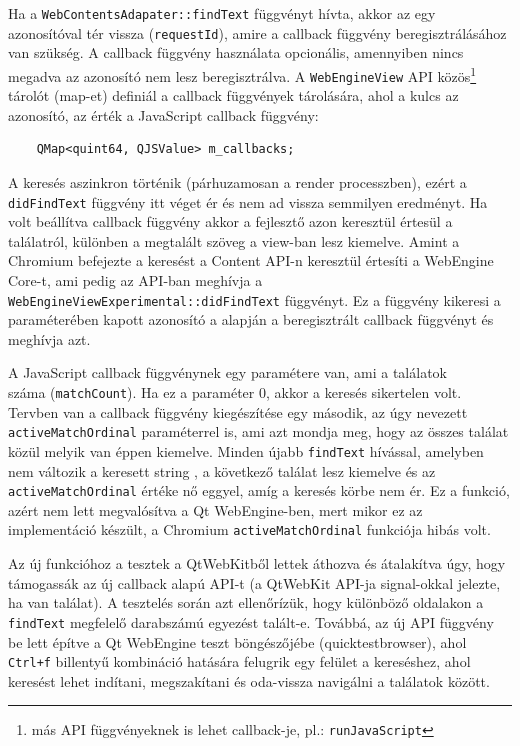 \documentclass[12pt]{report}
\begin{document}
Ha a \texttt{WebContentsAdapater::findText} függvényt hívta, akkor az egy azonosítóval
tér vissza (\texttt{requestId}), amire a callback függvény beregisztrálásához van szükség.
A callback függvény használata opcionális, amennyiben nincs megadva az azonosító nem lesz
beregisztrálva. A \texttt{WebEngineView} API közös\footnote{más API függvényeknek is lehet
callback-je, pl.: \texttt{runJavaScript}} tárolót (map-et) definiál a callback függvények
tárolására, ahol a kulcs az azonosító, az érték a JavaScript callback függvény:
\begin{verbatim}
    QMap<quint64, QJSValue> m_callbacks;
\end{verbatim}
A keresés aszinkron történik (párhuzamosan a render processzben), ezért a \\
\texttt{didFindText} függvény itt véget ér és nem ad vissza semmilyen eredményt. Ha volt
beállítva callback függvény akkor a fejlesztő azon keresztül értesül a találatról, különben
a megtalált szöveg a view-ban lesz kiemelve. Amint a Chromium befejezte a keresést a
Content API-n keresztül értesíti a WebEngine Core-t, ami pedig az API-ban meghívja a
\texttt{WebEngineViewExperimental::didFindText} függvényt. Ez a függvény kikeresi a
paraméterében kapott azonosító a alapján a beregisztrált callback függvényt és meghívja azt.

A JavaScript callback függvénynek egy paramétere van, ami a találatok \\
száma (\texttt{matchCount}). Ha ez a paraméter 0, akkor a keresés sikertelen volt.
Tervben van a callback függvény kiegészítése egy második, az úgy nevezett \\
\texttt{activeMatchOrdinal} paraméterrel is, ami azt mondja meg, hogy az összes találat
közül melyik van éppen kiemelve. Minden újabb \texttt{findText} hívással, amelyben nem
változik a keresett string , a következő találat lesz kiemelve és az \\
\texttt{activeMatchOrdinal} értéke nő eggyel, amíg a keresés körbe nem ér.
Ez a funkció, azért nem lett megvalósítva a Qt WebEngine-ben, mert mikor
ez az implementáció készült, a Chromium \texttt{activeMatchOrdinal} funkciója hibás volt.

Az új funkcióhoz a tesztek a QtWebKitből lettek áthozva és átalakítva úgy, hogy
támogassák az új callback alapú API-t (a QtWebKit API-ja signal-okkal jelezte, ha van
találat). A tesztelés során azt ellenőrízük, hogy különböző oldalakon a \texttt{findText}
megfelelő darabszámú egyezést talált-e. Továbbá, az új API függvény be lett építve a
Qt WebEngine teszt böngészőjébe (quicktestbrowser), ahol \texttt{Ctrl+f} billentyű kombináció
hatására felugrik egy felület a kereséshez, ahol keresést lehet indítani, megszakítani és
oda-vissza navigálni a találatok között.
\end{document}
